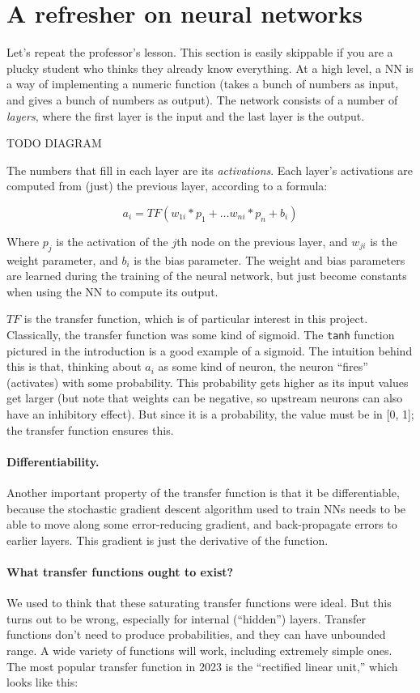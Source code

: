 \documentclass[twocolumn]{article}
\begin{document}
\section{A refresher on neural networks}
Let's repeat the professor's lesson. This section is easily skippable
if you are a plucky student who thinks they already know everything.
At a high level, a NN is a way of implementing a numeric function
(takes a bunch of numbers as input, and gives a bunch of numbers as
output). The network consists of a number of {\it layers}, where the first
layer is the input and the last layer is the output.

TODO DIAGRAM

The numbers that fill in each layer are its {\it activations}. Each
layer's activations are computed from (just) the previous layer,
according to a formula:

$$a_i = TF(w_{1i} * p_1 + \ldots w_{ni} * p_n + b_i)$$

Where $p_j$ is the activation of the $j$th node on the previous layer,
and $w_{ji}$ is the weight parameter, and $b_i$ is the bias parameter.
The weight and bias parameters are learned during the training of the
neural network, but just become constants when using the NN to compute
its output.

$TF$ is the transfer function, which is of particular interest in this
project. Classically, the transfer function was some kind of sigmoid.
The {\tt tanh} function pictured in the introduction is a good example
of a sigmoid. The intuition behind this is that, thinking about $a_i$
as some kind of neuron, the neuron ``fires'' (activates) with some
probability. This probability gets higher as its input values get
larger (but note that weights can be negative, so upstream neurons can
also have an inhibitory effect). But since it is a probability, the
value must be in [0, 1]; the transfer function ensures this.

\paragraph{Differentiability.}
Another important property of the transfer function is that it be
differentiable, because the stochastic gradient descent algorithm used
to train NNs needs to be able to move along some error-reducing
gradient, and back-propagate errors to earlier layers. This gradient
is just the derivative of the function.

\paragraph{What transfer functions ought to exist?}
We used to think that these saturating transfer functions were ideal.
But this turns out to be wrong, especially for internal (``hidden'')
layers. Transfer functions don't need to produce probabilities, and
they can have unbounded range. A wide variety of functions will work,
including extremely simple ones. The most popular transfer function in
2023 is the ``rectified linear unit,'' which looks like this:
\end{document}
